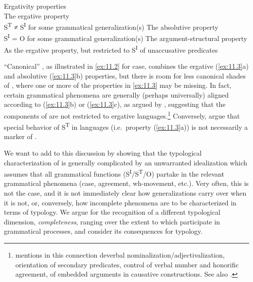 \documentclass[output=paper]{langsci/langscibook}
\begin{document}
\ea%
    \label{ex:11.3}Ergativity properties \citep{Deal2015}\\
	\ea The ergative property\\
        S\textsuperscript{T} ≠ S\textsuperscript{I} for some grammatical
        generalization(s)
	\ex The absolutive property\\
        S\textsuperscript{I} = O for some grammatical generalization(s)
	\ex The argument-structural property\\
        As the ergative property, but restricted to S\textsuperscript{I} of
        unaccusative predicates
	\z
\z

\enquote{Canonical} , as illustrated in \eqref{ex:11.2} for
 case, combines the ergative (\ref{ex:11.3}a) and absolutive (\ref{ex:11.3}b)
properties, but there is room for less canonical shades of , where
one or more of the properties in \eqref{ex:11.3} may be missing. In fact,
certain grammatical phenomena are generally (perhaps universally) aligned
according to (\ref{ex:11.3}b) or (\ref{ex:11.3}c), as argued by \textcite{Queixalos2013}, suggesting
that the components of  are not restricted to ergative
languages.\footnote{\textcite{Queixalos2013} mentions in this connection
    deverbal nominalization/adjectivalization, orientation of secondary
    predicates, control of verbal number and honorific agreement,  of
embedded arguments in causative constructions. See also
\citet{Moravcsik1978,Plank1979}.\label{fn:3}} Conversely,
\citet{VerbekeWillems2012} argue that special behavior of S\textsuperscript{T}
in  languages (i.e.\ property (\ref{ex:11.3}a)) is not
necessarily a marker of .

We want to add to this discussion by showing that the typological
characterization of  is generally complicated by an unwarranted
idealization which assumes that all grammatical functions
(S\textsuperscript{I}/S\textsuperscript{T}/O) partake in the relevant
grammatical phenomena (case, agreement, wh-movement, etc.). Very often, this is
not the case, and it is not immediately clear how  generalizations
carry over when it is not, or, conversely, how incomplete phenomena are to be
characterized in terms of  typology. We argue for the recognition of a
different typological dimension, \emph{completeness}, ranging over the extent
to which  participate in grammatical processes, and
consider its consequences for  typology.
\end{document}
